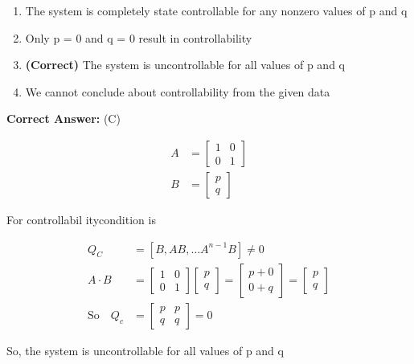 \documentclass[11pt,a4paper]{article}
\begin{document}
\begin{enumerate}[label=(\Alph*)]
    \item The system is completely state controllable for any nonzero values of p and q
    \item Only p = 0 and q = 0 result in controllability
    \item \textbf{(Correct)} The system is uncontrollable for all values of p and q
    \item We cannot conclude about controllability from the given data
\end{enumerate}

\noindent \textbf{Correct Answer:} (C)

\begin{tcolorbox}[solbox, title=Detailed Solution -- Question 136]
\[
\begin{aligned} A&=\left[\begin{array}{ll}1 & 0 \\0 & 1\end{array}\right] \\ B&=\left[\begin{array}{l}p \\q\end{array}\right] \end{aligned}
\]

 For controllabil itycondition is

\[
\begin{aligned} Q_{C}&=\left[B, A B, \ldots A^{n-1} B\right] \neq 0\\ A \cdot B&=\left[\begin{array}{ll}1 & 0 \\0 & 1\end{array}\right]\left[\begin{array}{l}p \\q\end{array}\right]=\left[\begin{array}{l}p+0 \\0+q\end{array}\right]=\left[\begin{array}{l}p \\q\end{array}\right]\\ \text{So}\quad Q_{c}&=\left[\begin{array}{ll}p & p \\ q & q\end{array}\right]=0 \end{aligned}
\]

 So, the system is uncontrollable for all values of p and q
\end{tcolorbox}
\end{document}
